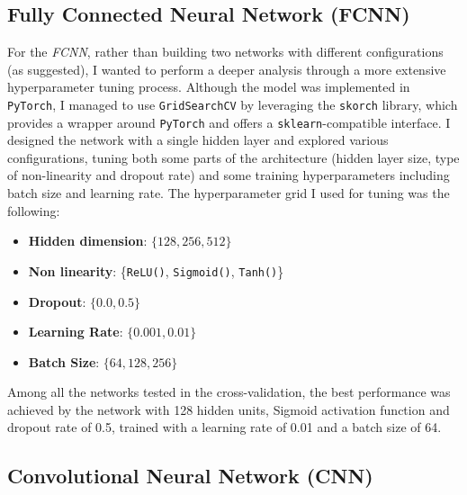 \subsection{Fully Connected Neural Network (FCNN)}\label{hybrid_model:fcnn}
For the \emph{FCNN}, rather than building two networks with different configurations (as suggested), I wanted to perform a deeper analysis 
through a more extensive hyperparameter tuning process. Although the model was implemented in \texttt{PyTorch}, I managed to use \texttt{GridSearchCV}
by leveraging the \texttt{skorch} library, which provides a wrapper around \texttt{PyTorch} and offers a \texttt{sklearn}-compatible 
interface. I designed the network with a single hidden layer and explored various configurations, tuning both some parts of the architecture 
(hidden layer size, type of non-linearity and dropout rate) and some training hyperparameters including batch size and learning rate. 
The hyperparameter grid I used for tuning was the following:
\begin{itemize}
    \item \textbf{Hidden dimension}: $\{128, 256, 512\}$
    \item \textbf{Non linearity}: \{\texttt{ReLU()}, \texttt{Sigmoid()}, \texttt{Tanh()}\}
    \item \textbf{Dropout}: $\{0.0, 0.5\}$
    \item \textbf{Learning Rate}: $\{0.001,0.01\}$
    \item \textbf{Batch Size}: $\{64, 128, 256\}$
\end{itemize}

Among all the networks tested in the cross-validation, the best performance was achieved by the network with 128 hidden units, Sigmoid 
activation function and dropout rate of 0.5, trained with a learning rate of 0.01 and a batch size of 64.

\subsection{Convolutional Neural Network (CNN)}\label{hybrid_model:cnn}

